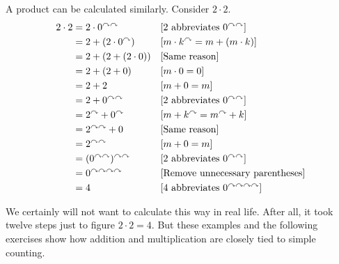 \begin{example}
A product can be calculated similarly. Consider $2\cdot 2$.
\begin{align*}
  2\cdot 2 &= 2\cdot 0^{\curvearrowright\curvearrowright} &&\text{[$2$ abbreviates $0^{\curvearrowright\curvearrowright}$]}\\
           &= 2 + (2\cdot 0^\curvearrowright) &&\text{[$m\cdot k^\curvearrowright = m + (m\cdot k)$]}\\
           &= 2 + (2 + (2\cdot 0))&&\text{[Same reason]}\\
           &= 2 + (2 + 0) &&\text{[$m\cdot 0=0$]}\\
           &= 2 + 2&&\text{[$m+0 = m$]}\\
           &= 2 + 0^{\curvearrowright\curvearrowright}&&\text{[$2$ abbreviates $0^{\curvearrowright\curvearrowright}$]}\\
           &= 2^\curvearrowright + 0^\curvearrowright &&\text{[$m+k^\curvearrowright = m^\curvearrowright+k$]}\\
           &= 2^{\curvearrowright\curvearrowright} + 0&&\text{[Same reason]}\\
           &= 2^{\curvearrowright\curvearrowright} &&\text{[$m+0 = m$]}\\
           &= (0^{\curvearrowright\curvearrowright})^{\curvearrowright\curvearrowright} &&\text{[$2$ abbreviates $0^{\curvearrowright\curvearrowright}$]}\\
           &= 0^{\curvearrowright\curvearrowright\curvearrowright\curvearrowright}&&\text{[Remove unnecessary parentheses]}\\
           &= 4 &&\text{[$4$ abbreviates $0^{\curvearrowright\curvearrowright\curvearrowright\curvearrowright}$]}
\end{align*}
\end{example}

We certainly will not want to calculate this way in real life. 
After all, it took twelve steps just to figure $2\cdot 2=4$. But these
examples and the following exercises show how addition and multiplication are
closely tied to simple counting. 

\ipadbreak

